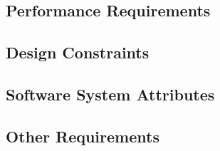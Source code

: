 \documentclass[a4paper,12pt]{article}
\begin{document}
\subsection{Performance Requirements}

\subsection{Design Constraints}

\subsection{Software System Attributes}

\subsection{Other Requirements}

\newpage
\clearpage
{}
\end{document}
